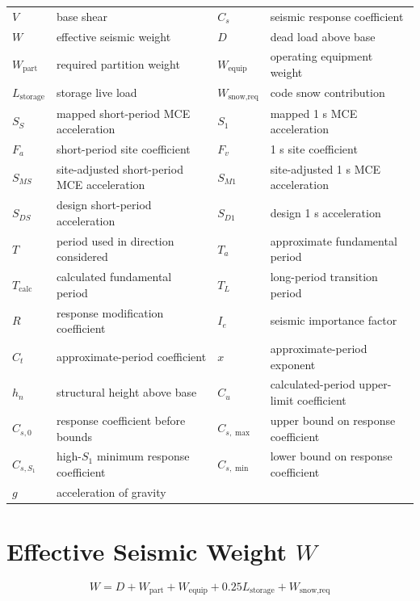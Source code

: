 \documentclass[10pt]{article}
\begin{document}
{\ttfamily\footnotesize
\renewcommand{\arraystretch}{1.02}
\begin{tabular}{@{}p{0.85in}p{2.25in}@{\quad}p{0.95in}p{2.25in}@{}}
$V$ & base shear &
$C_s$ & seismic response coefficient \\
$W$ & effective seismic weight &
$D$ & dead load above base \\
$W_{\text{part}}$ & required partition weight &
$W_{\text{equip}}$ & operating equipment weight \\
$L_{\text{storage}}$ & storage live load &
$W_{\text{snow,req}}$ & code snow contribution \\
$S_S$ & mapped short-period MCE acceleration &
$S_1$ & mapped 1 s MCE acceleration \\
$F_a$ & short-period site coefficient &
$F_v$ & 1 s site coefficient \\
$S_{MS}$ & site-adjusted short-period MCE acceleration &
$S_{M1}$ & site-adjusted 1 s MCE acceleration \\
$S_{DS}$ & design short-period acceleration &
$S_{D1}$ & design 1 s acceleration \\
$T$ & period used in direction considered &
$T_a$ & approximate fundamental period \\
$T_{\text{calc}}$ & calculated fundamental period &
$T_L$ & long-period transition period \\
$R$ & response modification coefficient &
$I_e$ & seismic importance factor \\
$C_t$ & approximate-period coefficient &
$x$ & approximate-period exponent \\
$h_n$ & structural height above base &
$C_u$ & calculated-period upper-limit coefficient \\
$C_{s,0}$ & response coefficient before bounds &
$C_{s,\max}$ & upper bound on response coefficient \\
$C_{s,S_1}$ & high-$S_1$ minimum response coefficient &
$C_{s,\min}$ & lower bound on response coefficient \\
$g$ & acceleration of gravity &
& \\
\end{tabular}
}

\section{Effective Seismic Weight $W$}

\begin{equation}
W = D + W_{\text{part}} + W_{\text{equip}} + 0.25L_{\text{storage}} + W_{\text{snow,req}}
\end{equation}
\end{document}
